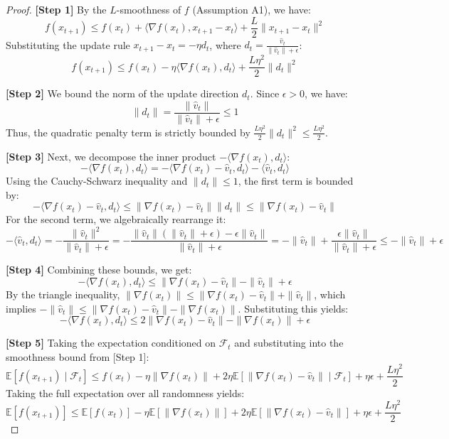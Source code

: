 \documentclass{article}
\begin{document}
\begin{proof}
\textbf{[Step 1]} By the $L$-smoothness of $f$ (Assumption A1), we have:
$$ f(x_{t+1}) \le f(x_t) + \langle \nabla f(x_t), x_{t+1} - x_t \rangle + \frac{L}{2} \|x_{t+1} - x_t\|^2 $$
Substituting the update rule $x_{t+1} - x_t = -\eta d_t$, where $d_t = \frac{\hat{v}_t}{\|\hat{v}_t\| + \epsilon}$:
$$ f(x_{t+1}) \le f(x_t) - \eta \langle \nabla f(x_t), d_t \rangle + \frac{L\eta^2}{2} \|d_t\|^2 $$

\textbf{[Step 2]} We bound the norm of the update direction $d_t$. Since $\epsilon > 0$, we have:
$$ \|d_t\| = \frac{\|\hat{v}_t\|}{\|\hat{v}_t\| + \epsilon} \le 1 $$
Thus, the quadratic penalty term is strictly bounded by $\frac{L\eta^2}{2} \|d_t\|^2 \le \frac{L\eta^2}{2}$.

\textbf{[Step 3]} Next, we decompose the inner product $-\langle \nabla f(x_t), d_t \rangle$:
$$ -\langle \nabla f(x_t), d_t \rangle = -\langle \nabla f(x_t) - \hat{v}_t, d_t \rangle - \langle \hat{v}_t, d_t \rangle $$
Using the Cauchy-Schwarz inequality and $\|d_t\| \le 1$, the first term is bounded by:
$$ -\langle \nabla f(x_t) - \hat{v}_t, d_t \rangle \le \|\nabla f(x_t) - \hat{v}_t\| \|d_t\| \le \|\nabla f(x_t) - \hat{v}_t\| $$
For the second term, we algebraically rearrange it:
$$ -\langle \hat{v}_t, d_t \rangle = -\frac{\|\hat{v}_t\|^2}{\|\hat{v}_t\| + \epsilon} = -\frac{\|\hat{v}_t\|(\|\hat{v}_t\| + \epsilon) - \epsilon\|\hat{v}_t\|}{\|\hat{v}_t\| + \epsilon} = -\|\hat{v}_t\| + \frac{\epsilon\|\hat{v}_t\|}{\|\hat{v}_t\| + \epsilon} \le -\|\hat{v}_t\| + \epsilon $$

\textbf{[Step 4]} Combining these bounds, we get:
$$ -\langle \nabla f(x_t), d_t \rangle \le \|\nabla f(x_t) - \hat{v}_t\| - \|\hat{v}_t\| + \epsilon $$
By the triangle inequality, $\|\nabla f(x_t)\| \le \|\nabla f(x_t) - \hat{v}_t\| + \|\hat{v}_t\|$, which implies $-\|\hat{v}_t\| \le \|\nabla f(x_t) - \hat{v}_t\| - \|\nabla f(x_t)\|$. Substituting this yields:
$$ -\langle \nabla f(x_t), d_t \rangle \le 2\|\nabla f(x_t) - \hat{v}_t\| - \|\nabla f(x_t)\| + \epsilon $$

\textbf{[Step 5]} Taking the expectation conditioned on $\mathcal{F}_t$ and substituting into the smoothness bound from [Step 1]:
$$ \mathbb{E}[f(x_{t+1}) \mid \mathcal{F}_t] \le f(x_t) - \eta \|\nabla f(x_t)\| + 2\eta \mathbb{E}[\|\nabla f(x_t) - \hat{v}_t\| \mid \mathcal{F}_t] + \eta\epsilon + \frac{L\eta^2}{2} $$
Taking the full expectation over all randomness yields:
$$ \mathbb{E}[f(x_{t+1})] \le \mathbb{E}[f(x_t)] - \eta \mathbb{E}[\|\nabla f(x_t)\|] + 2\eta \mathbb{E}[\|\nabla f(x_t) - \hat{v}_t\|] + \eta\epsilon + \frac{L\eta^2}{2} $$


\end{proof}
\end{document}
